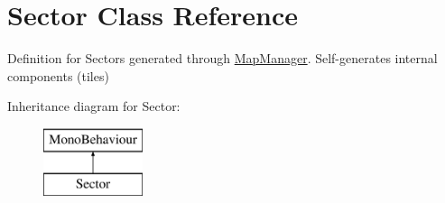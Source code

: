 \hypertarget{class_sector}{}\section{Sector Class Reference}
\label{class_sector}


Definition for Sectors generated through \hyperlink{class_map_manager}{Map\+Manager}. Self-\/generates internal components (tiles)  


Inheritance diagram for Sector\+:\begin{figure}[H]
\begin{center}
\leavevmode
\includegraphics[height=2.000000cm]{class_sector}
\end{center}
\end{figure}
